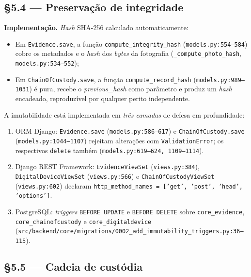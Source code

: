 \documentclass[a4paper,11pt]{article}
\begin{document}
\subsection*{§5.4 --- Preservação de integridade}

\textbf{Implementação.} \emph{Hash} SHA-256 calculado automaticamente:
\begin{itemize}
    \item Em \texttt{Evidence.save}, a função
          \texttt{compute\_integrity\_hash}
          (\texttt{models.py:554--584}) cobre os metadados e o
          \emph{hash} dos \emph{bytes} da fotografia
          (\texttt{\_compute\_photo\_hash}, \texttt{models.py:534--552});
    \item Em \texttt{ChainOfCustody.save}, a função
          \texttt{compute\_record\_hash}
          (\texttt{models.py:989--1031}) é pura, recebe o
          \emph{previous\_hash} como parâmetro e produz um \emph{hash}
          encadeado, reproduzível por qualquer perito independente.
\end{itemize}

A imutabilidade está implementada em \emph{três camadas} de defesa em
profundidade:
\begin{enumerate}
    \item ORM Django: \texttt{Evidence.save}
          (\texttt{models.py:586--617}) e
          \texttt{ChainOfCustody.save}
          (\texttt{models.py:1044--1107}) rejeitam alterações com
          \texttt{ValidationError}; os respectivos \texttt{delete}
          também (\texttt{models.py:619--624, 1109--1114}).
    \item Django REST Framework: \texttt{EvidenceViewSet}
          (\texttt{views.py:384}), \texttt{DigitalDeviceViewSet}
          (\texttt{views.py:566}) e \texttt{ChainOfCustodyViewSet}
          (\texttt{views.py:602}) declaram
          \texttt{http\_method\_names = ['get', 'post', 'head', 'options']}.
    \item PostgreSQL: \emph{triggers} \texttt{BEFORE UPDATE} e
          \texttt{BEFORE DELETE} sobre \texttt{core\_evidence},
          \texttt{core\_chainofcustody} e \texttt{core\_digitaldevice}
          (\texttt{src/backend/core/migrations/0002\_add\_immutability\_triggers.py:36--115}).
\end{enumerate}

\subsection*{§5.5 --- Cadeia de custódia}
\end{document}
